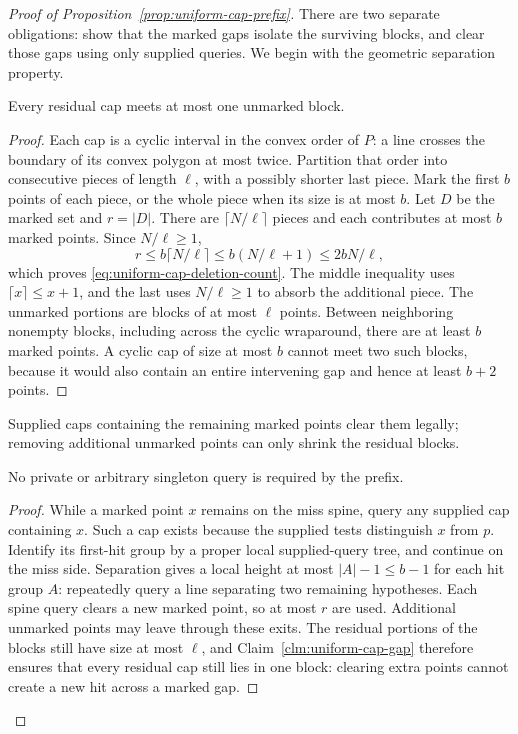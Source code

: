 \begin{proof}[Proof of Proposition~\ref{prop:uniform-cap-prefix}]
There are two separate obligations: show that the marked gaps
isolate the surviving blocks, and clear those gaps using only supplied
queries. We begin with the geometric separation property.

\begin{claim}
\label{clm:uniform-cap-gap}
Every residual cap meets at most one unmarked block.
\end{claim}
\begin{proof}
Each cap is a cyclic interval in the convex order of $P$: a line
crosses the boundary of its convex polygon at most twice. Partition
that order into consecutive pieces of length $\ell$, with a possibly
shorter last piece. Mark the first $b$ points of each piece, or the
whole piece when its size is at most $b$. Let $D$ be the marked set
and $r=|D|$. There are $\lceil N/\ell\rceil$ pieces and each contributes
at most $b$ marked points. Since $N/\ell\ge1$,
\[
 r\le b\lceil N/\ell\rceil
   \le b(N/\ell+1)\le2bN/\ell,
\]
which proves \eqref{eq:uniform-cap-deletion-count}.
The middle inequality uses $\lceil x\rceil\le x+1$, and the last
uses $N/\ell\ge1$ to absorb the additional piece.
The unmarked portions are blocks of at most $\ell$ points. Between
neighboring nonempty blocks, including across the cyclic wraparound,
there are at least $b$ marked points. A cyclic cap of size at most $b$
cannot meet two such blocks, because it would also contain an entire
intervening gap and hence at least $b+2$ points.

\end{proof}
Supplied caps containing the remaining marked points clear them
legally; removing additional unmarked points can only shrink the
residual blocks.

\begin{claim}
No private or arbitrary singleton query is required by the prefix.
\end{claim}
\begin{proof}
While a marked point $x$ remains on the miss spine, query any supplied
cap containing $x$. Such a cap exists because the supplied tests
distinguish $x$ from $p$. Identify its first-hit group by a proper
local supplied-query tree, and continue on the miss side. Separation
gives a local height at most $|A|-1\le b-1$ for each hit group $A$:
repeatedly query a line separating two remaining hypotheses. Each
spine query clears a new marked point, so at most $r$ are used.
Additional unmarked points may leave through these exits. The
residual portions of the blocks still have size at most $\ell$, and
Claim~\ref{clm:uniform-cap-gap} therefore ensures that every residual
cap still lies in one block: clearing extra points cannot create a
new hit across a marked gap.


\end{proof}
\end{proof}
